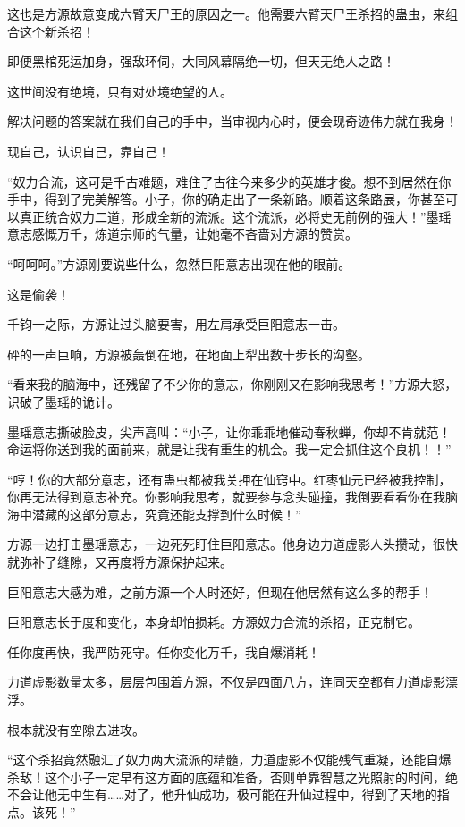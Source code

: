 \begin{this_body}
这也是方源故意变成六臂天尸王的原因之一。他需要六臂天尸王杀招的蛊虫，来组合这个新杀招！

即便黑棺死运加身，强敌环伺，大同风幕隔绝一切，但天无绝人之路！

这世间没有绝境，只有对处境绝望的人。

解决问题的答案就在我们自己的手中，当审视内心时，便会现奇迹伟力就在我身！

现自己，认识自己，靠自己！

“奴力合流，这可是千古难题，难住了古往今来多少的英雄才俊。想不到居然在你手中，得到了完美解答。小子，你的确走出了一条新路。顺着这条路展，你甚至可以真正统合奴力二道，形成全新的流派。这个流派，必将史无前例的强大！”墨瑶意志感慨万千，炼道宗师的气量，让她毫不吝啬对方源的赞赏。

“呵呵呵。”方源刚要说些什么，忽然巨阳意志出现在他的眼前。

这是偷袭！

千钧一之际，方源让过头脑要害，用左肩承受巨阳意志一击。

砰的一声巨响，方源被轰倒在地，在地面上犁出数十步长的沟壑。

“看来我的脑海中，还残留了不少你的意志，你刚刚又在影响我思考！”方源大怒，识破了墨瑶的诡计。

墨瑶意志撕破脸皮，尖声高叫：“小子，让你乖乖地催动春秋蝉，你却不肯就范！命运将你送到我的面前来，就是让我有重生的机会。我一定会抓住这个良机！！”

“哼！你的大部分意志，还有蛊虫都被我关押在仙窍中。红枣仙元已经被我控制，你再无法得到意志补充。你影响我思考，就要参与念头碰撞，我倒要看看你在我脑海中潜藏的这部分意志，究竟还能支撑到什么时候！”

方源一边打击墨瑶意志，一边死死盯住巨阳意志。他身边力道虚影人头攒动，很快就弥补了缝隙，又再度将方源保护起来。

巨阳意志大感为难，之前方源一个人时还好，但现在他居然有这么多的帮手！

巨阳意志长于度和变化，本身却怕损耗。方源奴力合流的杀招，正克制它。

任你度再快，我严防死守。任你变化万千，我自爆消耗！

力道虚影数量太多，层层包围着方源，不仅是四面八方，连同天空都有力道虚影漂浮。

根本就没有空隙去进攻。

“这个杀招竟然融汇了奴力两大流派的精髓，力道虚影不仅能残气重凝，还能自爆杀敌！这个小子一定早有这方面的底蕴和准备，否则单靠智慧之光照射的时间，绝不会让他无中生有……对了，他升仙成功，极可能在升仙过程中，得到了天地的指点。该死！”


\end{this_body}
